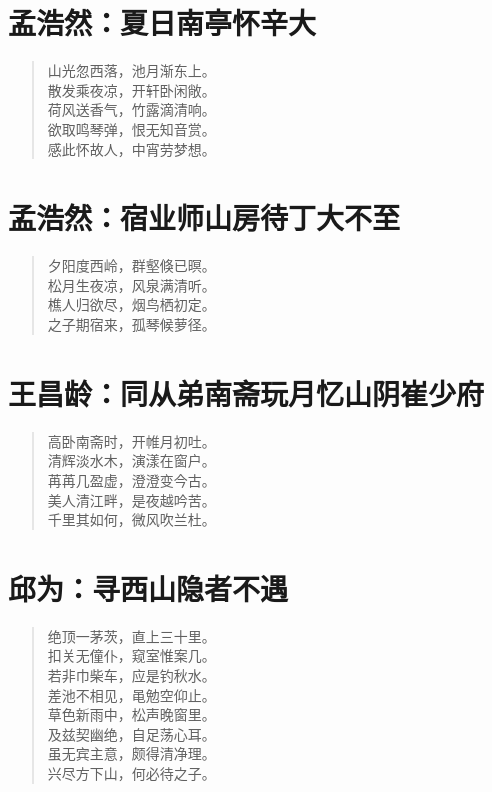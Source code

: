 \documentclass[12pt,oneside]{book}
\newenvironment{shici}{
\begin{verse}
\centering\large\hspace{12pt}}
{\end{verse}}
\begin{document}
\chapter{孟浩然：夏日南亭怀辛大}
\begin{shici}
山光忽西落，池月渐东上。\\
散发乘夜凉，开轩卧闲敞。\\
荷风送香气，竹露滴清响。\\
欲取鸣琴弹，恨无知音赏。\\
感此怀故人，中宵劳梦想。
\end{shici}

\chapter{孟浩然：宿业师山房待丁大不至}
\begin{shici}
夕阳度西岭，群壑倏已暝。\\
松月生夜凉，风泉满清听。\\
樵人归欲尽，烟鸟栖初定。\\
之子期宿来，孤琴候萝径。
\end{shici}

\chapter{王昌龄：同从弟南斋玩月忆山阴崔少府}
\begin{shici}
高卧南斋时，开帷月初吐。\\
清辉淡水木，演漾在窗户。\\
苒苒几盈虚，澄澄变今古。\\
美人清江畔，是夜越吟苦。\\
千里其如何，微风吹兰杜。
\end{shici}

\chapter{邱为：寻西山隐者不遇}
\begin{shici}
绝顶一茅茨，直上三十里。\\
扣关无僮仆，窥室惟案几。\\
若非巾柴车，应是钓秋水。\\
差池不相见，黾勉空仰止。\\
草色新雨中，松声晚窗里。\\
及兹契幽绝，自足荡心耳。\\
虽无宾主意，颇得清净理。\\
兴尽方下山，何必待之子。
\end{shici}
\end{document}
